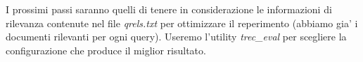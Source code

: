 \documentclass[12pt]{article}
\begin{document}
I prossimi passi saranno quelli di tenere in considerazione le informazioni di rilevanza contenute nel file \textit{qrels.txt} per ottimizzare il reperimento (abbiamo gia' i documenti rilevanti per ogni query). Useremo l'utility \textit{trec\_eval} per scegliere la configurazione che produce il miglior risultato.



\end{document}
